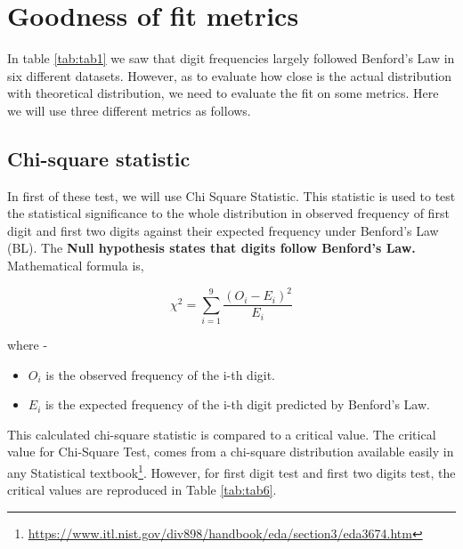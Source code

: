 \documentclass[
]{book}
\providecommand{\tightlist}{%
  \setlength{\itemsep}{0pt}\setlength{\parskip}{0pt}}
\begin{document}
\hypertarget{goodness-of-fit-metrics}{%
\section{Goodness of fit metrics}\label{goodness-of-fit-metrics}}

In table \ref{tab:tab1} we saw that digit frequencies largely followed Benford's Law in six different datasets. However, as to evaluate how close is the actual distribution with theoretical distribution, we need to evaluate the fit on some metrics. Here we will use three different metrics as follows.

\hypertarget{chis}{%
\subsection{Chi-square statistic}\label{chis}}

In first of these test, we will use Chi Square Statistic. This statistic is used to test the statistical significance to the whole distribution in observed frequency of first digit and first two digits against their expected frequency under Benford's Law (BL). The \textbf{Null hypothesis states that digits follow Benford's Law.} Mathematical formula is,

\begin{equation} 
\chi^2 = \sum_{i=1}^{9} \frac{(O_i - E_i)^2}{E_i}
\label{eq:ben3}
\end{equation}

where -

\begin{itemize}
\tightlist
\item
  \(O_i\) is the observed frequency of the i-th digit.
\item
  \(E_i\) is the expected frequency of the i-th digit predicted by Benford's Law.
\end{itemize}

This calculated chi-square statistic is compared to a critical value. The critical value for Chi-Square Test, comes from a chi-square distribution available easily in any Statistical textbook\footnote{\url{https://www.itl.nist.gov/div898/handbook/eda/section3/eda3674.htm}}. However, for first digit test and first two digits test, the critical values are reproduced in Table \ref{tab:tab6}.
\end{document}
